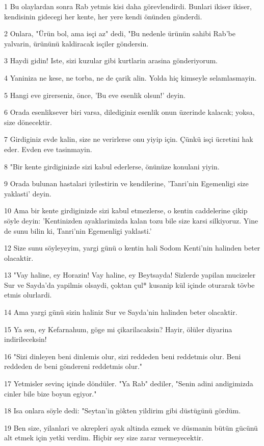 \par 1 Bu olaylardan sonra Rab yetmis kisi daha görevlendirdi. Bunlari ikiser ikiser, kendisinin gidecegi her kente, her yere kendi önünden gönderdi.
\par 2 Onlara, "Ürün bol, ama isçi az" dedi, "Bu nedenle ürünün sahibi Rab'be yalvarin, ürününü kaldiracak isçiler göndersin.
\par 3 Haydi gidin! Iste, sizi kuzular gibi kurtlarin arasina gönderiyorum.
\par 4 Yaniniza ne kese, ne torba, ne de çarik alin. Yolda hiç kimseyle selamlasmayin.
\par 5 Hangi eve girerseniz, önce, 'Bu eve esenlik olsun!' deyin.
\par 6 Orada esenliksever biri varsa, dilediginiz esenlik onun üzerinde kalacak; yoksa, size dönecektir.
\par 7 Girdiginiz evde kalin, size ne verirlerse onu yiyip için. Çünkü isçi ücretini hak eder. Evden eve tasinmayin.
\par 8 "Bir kente girdiginizde sizi kabul ederlerse, önünüze konulani yiyin.
\par 9 Orada bulunan hastalari iyilestirin ve kendilerine, 'Tanri'nin Egemenligi size yaklasti' deyin.
\par 10 Ama bir kente girdiginizde sizi kabul etmezlerse, o kentin caddelerine çikip söyle deyin: 'Kentinizden ayaklarimizda kalan tozu bile size karsi silkiyoruz. Yine de sunu bilin ki, Tanri'nin Egemenligi yaklasti.'
\par 12 Size sunu söyleyeyim, yargi günü o kentin hali Sodom Kenti'nin halinden beter olacaktir.
\par 13 "Vay haline, ey Horazin! Vay haline, ey Beytsayda! Sizlerde yapilan mucizeler Sur ve Sayda'da yapilmis olsaydi, çoktan çul* kusanip kül içinde oturarak tövbe etmis olurlardi.
\par 14 Ama yargi günü sizin haliniz Sur ve Sayda'nin halinden beter olacaktir.
\par 15 Ya sen, ey Kefarnahum, göge mi çikarilacaksin? Hayir, ölüler diyarina indirileceksin!
\par 16 "Sizi dinleyen beni dinlemis olur, sizi reddeden beni reddetmis olur. Beni reddeden de beni göndereni reddetmis olur."
\par 17 Yetmisler sevinç içinde döndüler. "Ya Rab" dediler, "Senin adini andigimizda cinler bile bize boyun egiyor."
\par 18 Isa onlara söyle dedi: "Seytan'in gökten yildirim gibi düstügünü gördüm.
\par 19 Ben size, yilanlari ve akrepleri ayak altinda ezmek ve düsmanin bütün gücünü alt etmek için yetki verdim. Hiçbir sey size zarar vermeyecektir.

